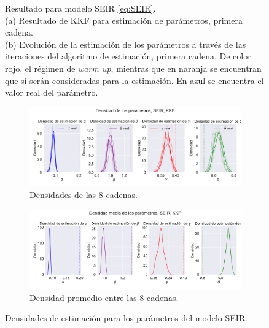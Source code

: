 \begin{figure}[h]
\begin{subfigure}[b]{0.49\textwidth}
         \caption{}
         \label{fig:nonlinear_filters_seir_params_evolution}
    \end{subfigure}
    \caption{Resultado para modelo SEIR \eqref{eq:SEIR}. \\
    (a) Resultado de KKF para estimación de parámetros, primera cadena. \\
    (b) Evolución de la estimación de los parámetros a través de las iteraciones del algoritmo de estimación, primera cadena. De color rojo, el régimen de \textit{warm up}, mientras que en naranja se encuentran que sí serán consideradas para la estimación. En azul se encuentra el valor real del parámetro.}
    \label{fig:SEIR}
\end{figure}

\begin{figure}[h]
    \centering
    \begin{subfigure}[b]{0.8\textwidth}
        \centering \includegraphics[width=0.9\linewidth]{img/content/chapter4/nonlinear_filters_seir_params_density.pdf}
    \caption{Densidades de las 8 cadenas.}
    \label{fig:nonlinear_filters_seir_params_density}
    \end{subfigure}
    \begin{subfigure}[b]{0.8\textwidth}
        \centering \includegraphics[width=0.9\linewidth]{img/content/chapter4/nonlinear_filters_seir_params_density_mean.pdf}
    \caption{Densidad promedio entre las 8 cadenas.}
    \label{fig:nonlinear_filters_seir_params_density_mean}
    \end{subfigure}
    \caption{Densidades de estimación para los parámetros del modelo SEIR.}
\end{figure}

